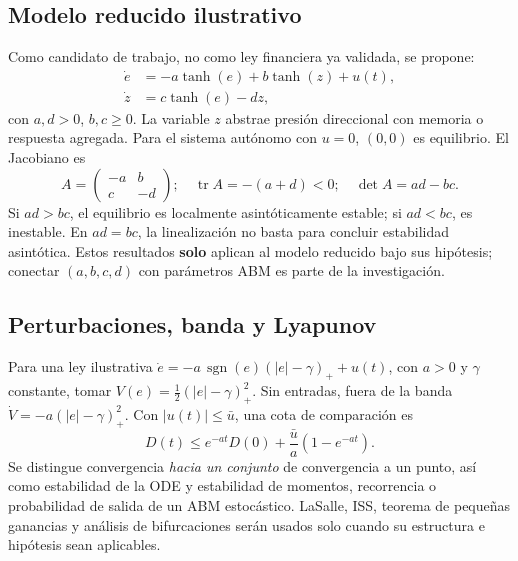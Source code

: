 \documentclass[11pt,a4paper]{article}
\begin{document}
\subsection{Modelo reducido ilustrativo}
Como candidato de trabajo, no como ley financiera ya validada, se propone:
\begin{align}
\dot e&=-a\tanh(e)+b\tanh(z)+u(t),\\
\dot z&=c\tanh(e)-dz,
\end{align}
con $a,d>0$, $b,c\ge0$. La variable $z$ abstrae presión direccional con memoria o respuesta agregada. Para el sistema autónomo con $u=0$, $(0,0)$ es equilibrio. El Jacobiano es
\begin{equation}
A=\begin{pmatrix}-a&b\\c&-d\end{pmatrix};\quad \operatorname{tr}A=-(a+d)<0;\quad \det A=ad-bc.
\end{equation}
Si $ad>bc$, el equilibrio es localmente asintóticamente estable; si $ad<bc$, es inestable. En $ad=bc$, la linealización no basta para concluir estabilidad asintótica. Estos resultados \textbf{solo} aplican al modelo reducido bajo sus hipótesis; conectar $(a,b,c,d)$ con parámetros ABM es parte de la investigación.
\subsection{Perturbaciones, banda y Lyapunov}
Para una ley ilustrativa $\dot e=-a\,\operatorname{sgn}(e)(|e|-\gamma)_++u(t)$, con $a>0$ y $\gamma$ constante, tomar $V(e)=\frac12(|e|-\gamma)_+^2$. Sin entradas, fuera de la banda $\dot V=-a(|e|-\gamma)_+^2$. Con $|u(t)|\le\bar u$, una cota de comparación es
\begin{equation}
D(t)\le e^{-at}D(0)+\frac{\bar u}{a}(1-e^{-at}).
\end{equation}
Se distingue convergencia \emph{hacia un conjunto} de convergencia a un punto, así como estabilidad de la ODE y estabilidad de momentos, recorrencia o probabilidad de salida de un ABM estocástico. LaSalle, ISS, teorema de pequeñas ganancias y análisis de bifurcaciones serán usados solo cuando su estructura e hipótesis sean aplicables.
\end{document}
